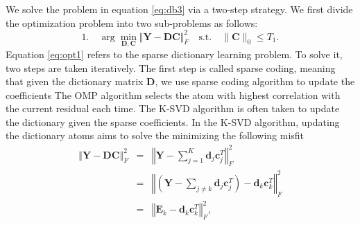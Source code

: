 We solve the problem in equation \ref{eq:db3} via a two-step strategy. We first divide the optimization problem into two sub-problems as follows:
\begin{equation}
\label{eq:opt1}
\text{1.}\quad \arg \min_{\mathbf{D},\mathbf{C}} \Vert \mathbf{Y}-\mathbf{D}\mathbf{C}\Vert_F^2\quad\text{s.t.}\quad\parallel\mathbf{C} \parallel_0\le T_1.
\end{equation}
Equation \ref{eq:opt1} refers to the sparse dictionary learning problem. To solve it, two steps are taken iteratively. The first step is called sparse coding, meaning that given the dictionary matrix $\mathbf{D}$, we use  sparse coding algorithm to update the coefficients
 The OMP algorithm selects the atom with highest correlation with the current residual each time. The K-SVD algorithm \cite[]{aksvd2008} is often taken to update the dictionary given the sparse coefficients. In the K-SVD algorithm, updating the dictionary atoms aims to solve the minimizing the following misfit
	\begin{equation}
	\begin{array}{ccl}
	\left\Vert\mathbf{Y}-\mathbf{D}\mathbf{C}\right\Vert_F^2 &= &\left\Vert\mathbf{Y}- \sum\limits_{j=1}^{K}\mathbf{d}_j\mathbf{c}_j^T\right\Vert_F^2\\
	&=&\left\Vert\left(\mathbf{Y}- \sum\limits_{j\neq k}\mathbf{d}_j\mathbf{c}_j^T\right)-\mathbf{d}_k\mathbf{c}_k^T\right\Vert_F^2\\
	&=&\left\Vert \mathbf{E}_k-\mathbf{d}_k\mathbf{c}_k^T	\right\Vert_F^2,
	\end{array}
	\label{eq:ksvd}
	\end{equation}
